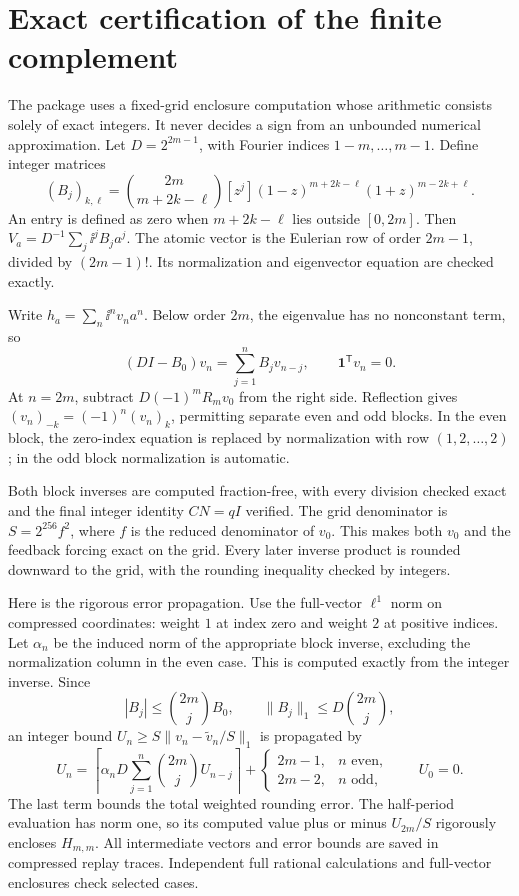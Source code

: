 \documentclass[11pt,a4paper]{article}
\theoremstyle{remark}\newtheorem*{ednote}{Editorial note (ProveIt, 2026-10-01)}
\begin{document}
\section{Exact certification of the finite complement}\label{sec:finite}
The package uses a fixed-grid enclosure computation whose arithmetic consists solely of exact integers. It never decides a sign from an unbounded numerical approximation. Let $D=2^{2m-1}$, with Fourier indices $1-m,\ldots,m-1$. Define integer matrices
\[
 (B_j)_{k,\ell}=\binom{2m}{m+2k-\ell}
 [z^j](1-z)^{m+2k-\ell}(1+z)^{m-2k+\ell}.
\]
An entry is defined as zero when $m+2k-\ell$ lies outside $[0,2m]$. Then $V_a=D^{-1}\sum_j\ii^jB_ja^j$. The atomic vector is the Eulerian row of order $2m-1$, divided by $(2m-1)!$. Its normalization and eigenvector equation are checked exactly.

Write $h_a=\sum_n\ii^nv_na^n$. Below order $2m$, the eigenvalue has no nonconstant term, so
\[
 (DI-B_0)v_n=\sum_{j=1}^nB_jv_{n-j},\qquad\boldsymbol1^{\mathsf T}v_n=0.
\]
At $n=2m$, subtract $D(-1)^mR_mv_0$ from the right side. Reflection gives $(v_n)_{-k}=(-1)^n(v_n)_k$, permitting separate even and odd blocks. In the even block, the zero-index equation is replaced by normalization with row $(1,2,\ldots,2)$; in the odd block normalization is automatic.

Both block inverses are computed fraction-free, with every division checked exact and the final integer identity $CN=qI$ verified. The grid denominator is $S=2^{256}f^2$, where $f$ is the reduced denominator of $v_0$. This makes both $v_0$ and the feedback forcing exact on the grid. Every later inverse product is rounded downward to the grid, with the rounding inequality checked by integers.

Here is the rigorous error propagation. Use the full-vector $\ell^1$ norm on compressed coordinates: weight $1$ at index zero and weight $2$ at positive indices. Let $\alpha_n$ be the induced norm of the appropriate block inverse, excluding the normalization column in the even case. This is computed exactly from the integer inverse. Since
\[
 |B_j|\le\binom{2m}{j}B_0,\qquad
 \|B_j\|_1\le D\binom{2m}{j},
\]
an integer bound $U_n\ge S\|v_n-\widetilde v_n/S\|_1$ is propagated by
\[
 U_n=\left\lceil\alpha_nD\sum_{j=1}^n\binom{2m}{j}U_{n-j}\right\rceil
       +\begin{cases}2m-1,&n\text{ even},\\2m-2,&n\text{ odd},\end{cases}
 \qquad U_0=0.
\]
The last term bounds the total weighted rounding error. The half-period evaluation has norm one, so its computed value plus or minus $U_{2m}/S$ rigorously encloses $H_{m,m}$. All intermediate vectors and error bounds are saved in compressed replay traces. Independent full rational calculations and full-vector enclosures check selected cases.
\end{document}
